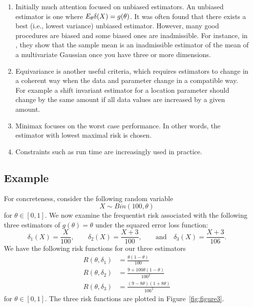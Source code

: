 \documentclass[twoside]{article}
\begin{document}
\begin{enumerate}
\item Initially much attention focused on unbiased estimators. An
  unbiased estimator is one where $E_{\theta}\delta(X) = g(\theta)$. It
  was often found that there exists a best (i.e., lowest variance) unbiased
  estimator.  However, many good procedures are biased and some biased
  ones are inadmissible.  For instance, in \cite{stein1956inadmissibility},
  they show that the sample mean is an inadmissible
  estimator of the mean of a multivariate Gaussian once you have three or
  more dimensions.
\item Equivariance is another useful criteria, which requires estimators
  to change in a coherent way when the data and parameter change in a
  compatible way. For example a shift invariant estimator for a location
  parameter should change by the same amount if all data values are increased
  by a given amount.
\item Minimax focuses on the worst case performance.  In other words, the estimator
   with lowest maximal risk is chosen.
\item Constraints such as run time are increasingly used in practice.
\end{enumerate}


\subsection{Example}

For concreteness, consider \citep[Example 3.1, p.~40-41]{keener} the following
random variable
\begin{equation*}
X \sim Bin(100, \theta)
\end{equation*}
for $\theta \in [0,1]$.  We now examine the frequentist risk associated with
the following three estimators of $g(\theta) = \theta$ under the squared error
loss function:
\begin{equation*}
\delta_1(X) = \frac{X}{100}, \qquad \delta_2(X) = \frac{X+3}{100},
              \qquad \text{and} \quad \delta_3(X) = \frac{X+3}{106}.
\end{equation*}
We have the following risk functions for our three estimators
\begin{align*}
R(\theta, \delta_1) &= \frac{\theta(1-\theta)}{100}\\
R(\theta, \delta_2) &= \frac{9+100 \theta(1-\theta)}{100^2}\\
R(\theta, \delta_3) &= \frac{(9-8\theta)(1+8\theta)}{106^2}
\end{align*}
for $\theta \in [0,1]$.  The three risk functions are plotted in
Figure~\ref{fig:figure3}. 
\end{document}

